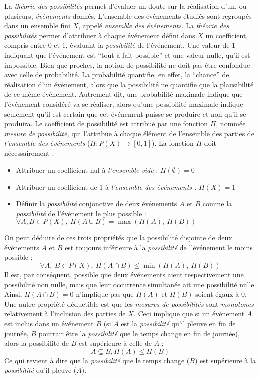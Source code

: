 La \emph{théorie des possibilités} permet d'évaluer un doute sur la
réalisation d'un, ou plusieurs, \emph{événements} donnés. L'ensemble
des événements étudiés sont regroupés dans un ensemble fini \(X\),
appelé \emph{ensemble des événements.} La \emph{théorie des
  possibilités} permet d'attribuer à chaque événement défini dans
\(X\) un coefficient, compris entre 0 et 1, évaluant la
\emph{possibilité} de l'événement. Une valeur de 1 indiquant que
l'événement est \enquote{tout à fait possible}
\autocite[p. 43]{Bouchon-Meunier2007} et une valeur nulle, qu'il est
impossible. Bien que proches, la notion de possibilité ne doit pas
être confondue avec celle de probabilité. La probabilité quantifie, en
effet, la \enquote{chance} de réalisation d'un événement, alors que la
possibilité ne quantifie que la plausibilité de ce même
événement. Autrement dit, une probabilité maximale indique que
l'événement considéré va se réaliser, alors qu'une possibilité
maximale indique seulement qu'il est certain que cet événement puisse
se produire et non qu'il se produira.  Le coefficient de possibilité
est attribué par une fonction \(Π\), nommée \emph{mesure de
  possibilité,} qui l'attribue à chaque élément de l'ensemble des
parties de \emph{l'ensemble des événements} (\(Π : P(X) → [0,1]\)). La
fonction \(Π\) doit nécessairement :

\begin{itemize}
\item Attribuer un coefficient nul à \emph{l'ensemble vide} :
  \(Π(∅)=0\)
\item Attribuer un coefficient de 1 à \emph{l'ensemble des événements
    :} \(Π(X)=1\)
\item Définir la \emph{possibilité} conjonctive de deux événements
  \(A\) et \(B\) comme la \emph{possibilité} de l'événement le plus
  possible : \(∀ A,B ∈ P(X),\ Π(A ∪ B) = \max(Π(A),\ Π(B))\)
\end{itemize}

On peut déduire de ces trois propriétés \autocite{Bouchon-Meunier2007}
que la possibilité disjointe de deux événements \(A\) et \(B\) est
toujours inférieure à la \emph{possibilité} de l'événement le moins
possible :
%
\begin{equation}
  ∀ A,\ B ∈ P(X),\ Π(A ∩ B) ≤ \min(Π(A),\ Π(B))
\end{equation}
%
Il est, par conséquent, possible que deux événements aient
respectivement une possibilité non nulle, mais que leur occurrence
simultanée ait une possibilité nulle. Ainsi, \( Π(A ∩ B) = 0\)
n'implique pas que \(Π(A)\) et \(Π(B)\) soient égaux à 0. Une autre
propriété déductible est que les \emph{mesures de possibilités} sont
\emph{monotones} relativement à l'inclusion des parties de \(X\). Ceci
implique que si un événement \(A\) est inclus dans un événement \(B\)
(\eg si \(A\) est la \emph{possibilité} qu'il pleuve en fin de
journée, \(B\) pourrait être la \emph{possibilité} que le temps change
en fin de journée), alors la possibilité de \(B\) est supérieure à
celle de \(A\) :
%
\begin{equation}
  A \subseteq B, Π(A) ≤ Π(B)
\end{equation}
%
Ce qui revient à dire que la \emph{possibilité} que le temps change
(\(B\)) est supérieure à la \emph{possibilité} qu'il pleuve (\(A\)).

